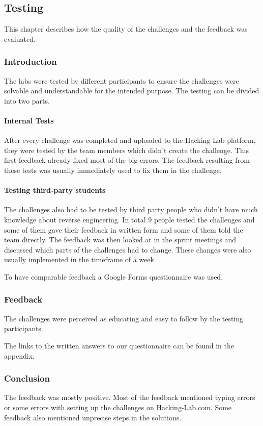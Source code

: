\label{sec:testing}
\subsection{Testing}
This chapter describes how the quality of the challenges and the feedback was evaluated.

\subsubsection{Introduction}
The labs were tested by different participants to ensure the challenges were solvable and understandable for the intended purpose. The testing can be divided into two parts.

\paragraph{Internal Tests}
After every challenge was completed and uploaded to the Hacking-Lab platform, they were tested by the team members which didn't create the challenge. This first feedback already fixed most of the big errors. The feedback resulting from these tests was usually immediately used to fix them in the challenge.

\paragraph{Testing third-party students}
The challenges also had to be tested by third party people who didn't have much knowledge about reverse engineering. In total 9 people tested the challenges and some of them gave their feedback in written form and some of them told the team directly. The feedback was then looked at in the sprint meetings and discussed which parts of the challenges had to change. These changes were also usually implemented in the timeframe of a week.

To have comparable feedback a Google Forms questionnaire was used.

\subsubsection{Feedback}
The challenges were perceived as educating and easy to follow by the testing participants.

The links to the written answers to our questionnaire can be found in the appendix.

\subsubsection{Conclusion}
The feedback was mostly positive. Most of the feedback mentioned typing errors or some errors with setting up the challenges on Hacking-Lab.com. Some feedback also mentioned unprecise steps in the solutions.

